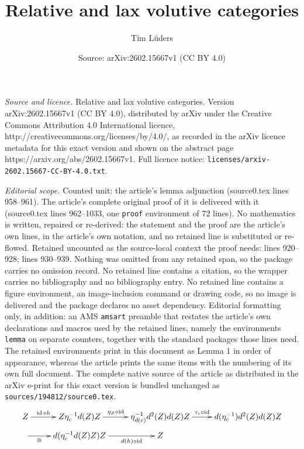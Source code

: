\documentclass[10pt,a4paper]{amsart}
\title{Relative and lax volutive categories}
\author{Tim L\"uders}
\date{Source: arXiv:2602.15667v1 (CC BY 4.0)}
\newcommand{\id}{\operatorname{id}}%
\begin{document}
\maketitle

\noindent\emph{Source and licence.} Relative and lax volutive categories. Version arXiv:2602.15667v1 (CC BY 4.0), distributed by arXiv under the Creative Commons Attribution 4.0 International licence, http://creativecommons.org/licenses/by/4.0/, as recorded in the arXiv licence metadata for this exact version and shown on the abstract page https://arxiv.org/abs/2602.15667v1. Full licence notice: \texttt{licenses/arxiv-2602.15667-CC-BY-4.0.txt}.\par\smallskip

\noindent\textit{Editorial scope.} Counted unit: the article's lemma adjunction (source0.tex lines 958--961). The article's complete original proof of it is delivered with it (source0.tex lines 962--1033, one \texttt{proof} environment of 72 lines). No mathematics is written, repaired or re-derived: the statement and the proof are the article's own lines, in the article's own notation, and no retained line is substituted or re-flowed.  Retained uncounted as the source-local context the proof needs: lines 920--928; lines 930--939.  Nothing was omitted from any retained span, so the package carries no omission record.  No retained line contains a citation, so the wrapper carries no bibliography and no bibliography entry.  No retained line contains a figure environment, an image-inclusion command or drawing code, so no image is delivered and the package declares no asset dependency.  Editorial formatting only, in addition: an AMS \texttt{amsart} preamble that restates the article's own declarations and macros used by the retained lines, namely the environments \texttt{lemma} on separate counters, together with the standard packages those lines need.  The retained environments print in this document as Lemma 1 in order of appearance, whereas the article prints the same items with the numbering of its own full document.  The complete native source of the article as distributed in the arXiv e-print for this exact version is bundled unchanged as \texttt{sources/194812/source0.tex}.
    \begin{equation}\label{Equation: first coherence condition of h in volutive adjunction}
        \begin{aligned}
        \xymatrix@R=0.5em{
            Z \ar[r]^-{\id \circ h} & Z \eta_c^{-1}  d(Z)  Z \ar[r]^-{\eta_Z \circ \id} & \eta_{d(c)}^{-1} d^2(Z)d(Z)Z 
            \ar[r]^-{\tau_c \circ \id} & d(\eta_c^{-1}) d^2(Z) d(Z) Z \\
            \ar[r]_-{\cong} & d(\eta_c^{-1} d(Z)Z) Z \ar[r]_-{d(h) \circ \id} & Z
        }
        \end{aligned}
    \end{equation}
\end{document}
